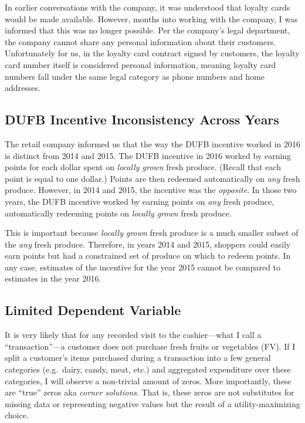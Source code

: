 \documentclass[12pt,letterpaperpaper,]{book}
\begin{document}
In earlier conversations with the company, it was understood that
loyalty cards would be made available. However, months into working with
the company, I was informed that this was no longer possible. Per the
company's legal department, the company cannot share any personal
information about their customers. Unfortunately for us, in the loyalty
card contract signed by customers, the loyalty card number itself is
considered personal information, meaning loyalty card numbers fall under
the same legal category as phone numbers and home addresses.

\subsection*{DUFB Incentive Inconsistency Across
Years}\label{dufb-incentive-inconsistency-across-years}

The retail company informed us that the way the DUFB incentive worked in
2016 is distinct from 2014 and 2015. The DUFB incentive in 2016 worked
by earning points for each dollar spent on \emph{locally grown} fresh
produce. (Recall that each point is equal to one dollar.) Points are
then redeemed automatically on \emph{any} fresh produce. However, in
2014 and 2015, the incentive was the \emph{opposite}. In those two
years, the DUFB incentive worked by earning points on \emph{any} fresh
produce, automatically redeeming points on \emph{locally grown} fresh
produce.

This is important because \emph{locally grown} fresh produce is a much
smaller subset of the \emph{any} fresh produce. Therefore, in years 2014
and 2015, shoppers could easily earn points but had a constrained set of
produce on which to redeem points. In any case, estimates of the
incentive for the year 2015 cannot be compared to estimates in the year
2016.

\subsection*{Limited Dependent
Variable}\label{limited-dependent-variable}

It is very likely that for any recorded visit to the cashier---what I
call a ``transaction''---a customer does not purchase fresh fruits or
vegetables (FV). If I split a customer's items purchased during a
transaction into a few general categories (e.g.~dairy, candy, meat,
etc.) and aggregated expenditure over these categories, I will observe a
non-trivial amount of zeros. More importantly, these are ``true'' zeros
aka \emph{corner solutions}. That is, these zeros are not substitutes
for missing data or representing negative values but the result of a
utility-maximizing choice.
\end{document}
